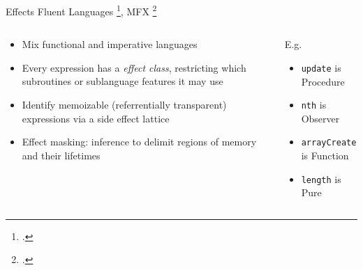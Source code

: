 \documentclass[aspectratio=169]{beamer}
\begin{document}
\begin{frame}{Effects}
    Fluent Languages \footcite{gifford_integrating_1986}, MFX \footcite{lucassen_polymorphic_1988}
  \begin{columns}[T]
    \begin{column}{0.68\textwidth}
        \begin{itemize}[<+->]
            \item Mix functional and imperative languages 
            \item Every expression has a \emph{effect class}, restricting which subroutines or sublanguage features it may use
            \item Identify memoizable (referrentially transparent) expressions via a side effect lattice %
            \item Effect masking: inference to delimit regions of memory and their lifetimes
        \end{itemize}
    \end{column}

    \pause

    \begin{column}{0.30\textwidth}
    \vspace{-0.2in}
    \footnotesize{

    \vspace{0.1in}
    \pause
    E.g.
    \begin{itemize}
        \item \texttt{update} is Procedure
        \item \texttt{nth} is Observer
        \item \texttt{arrayCreate} is Function
        \item \texttt{length} is Pure
    \end{itemize}
    }
    \end{column}
  \end{columns}
  \vspace{-0.3in}
\end{frame}
\end{document}
